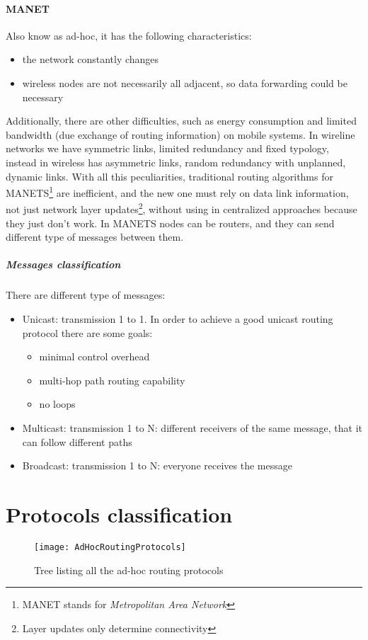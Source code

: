 \paragraph*{MANET} Also know as ad-hoc, it has the following characteristics:
\begin{itemize}
\item the network constantly changes
\item wireless nodes are not necessarily all adjacent, so data forwarding
  could be necessary
\end{itemize}
Additionally, there are other difficulties, such as energy consumption and
limited bandwidth (due exchange of routing information) on mobile systems. In
wireline networks we have symmetric links, limited redundancy and fixed
typology, instead in wireless has asymmetric links, random redundancy with
unplanned, dynamic links. With all this peculiarities, traditional routing
algorithms for MANETS\footnote{MANET stands for \textit{Metropolitan Area
    Network}} are inefficient, and the new one must rely on data link
information, not just network layer updates\footnote{Layer updates only
  determine connectivity}, without using in centralized approaches because they
just don't work. In MANETS nodes can be routers, and they can send different
type of messages between them.
\subparagraph*{Messages classification} There are different type of messages:
\begin{itemize}
\item Unicast: transmission 1 to 1. In order to achieve a good unicast routing
  protocol there are some goals:
  \begin{itemize}
  \item minimal control overhead
  \item multi-hop path routing capability
  \item no loops
  \end{itemize}
\item Multicast: transmission 1 to N: different receivers of the same message,
  that it can follow different paths
\item Broadcast: transmission 1 to N: everyone receives the message
\end{itemize}

\section{Protocols classification}

\begin{figure}[t]
  \centering
  \texttt{[image: AdHocRoutingProtocols]}
  \caption{Tree listing all the ad-hoc routing protocols}
  \label{fig:mac:adHocRoutingProtocols}
\end{figure}


